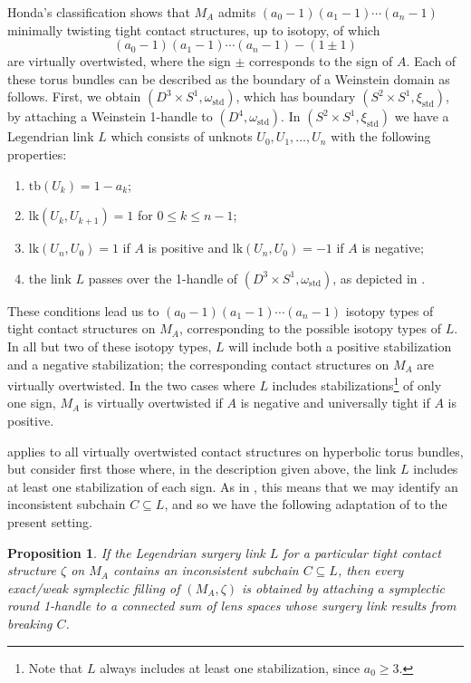 \documentclass[11pt]{amsart}
\numberwithin{equation}{section}
\theoremstyle{plain}
\newtheorem{prop}[equation]{Proposition}%
\theoremstyle{definition}
\theoremstyle{remark}\newtheorem{rem}[equation]{Remark}%
\theoremstyle{remark}\newtheorem{obs}[equation]{Observation}%
\begin{document}
Honda's classification shows that $M_A$ admits $(a_0-1)(a_1-1)\cdots(a_n-1)$ minimally twisting tight contact structures, up to isotopy, of which
\[
(a_0-1)(a_1-1)\cdots(a_n-1)-(1\pm 1)
\]
are virtually overtwisted, where the sign $\pm$ corresponds to the sign of $A$.  Each of these torus bundles can be described as the boundary of a Weinstein domain as follows.  First, we obtain $(D^3\times S^1,\omega_{\mathrm{std}})$, which has boundary $(S^2\times S^1,\xi_{\mathrm{std}})$, by attaching a Weinstein 1-handle to $(D^4,\omega_{\mathrm{std}})$.  In $(S^2\times S^1,\xi_{\mathrm{std}})$ we have a Legendrian link $L$ which consists of unknots $U_0,U_1,\ldots,U_n$ with the following properties:
\begin{enumerate}
    \item $\mathrm{tb}(U_k)=1-a_k$;
    \item $\mathrm{lk}(U_k,U_{k+1})=1$ for $0\leq k\leq n-1$;
    \item $\mathrm{lk}(U_n,U_0)=1$ if $A$ is positive and $\mathrm{lk}(U_n,U_0)=-1$ if $A$ is negative;
    \item the link $L$ passes over the 1-handle of $(D^3\times S^1,\omega_{\mathrm{std}})$, as depicted in .
\end{enumerate}
These conditions lead us to $(a_0-1)(a_1-1)\cdots(a_n-1)$ isotopy types of tight contact structures on $M_A$, corresponding to the possible isotopy types of $L$.  In all but two of these isotopy types, $L$ will include both a positive stabilization and a negative stabilization; the corresponding contact structures on $M_A$ are virtually overtwisted.  In the two cases where $L$ includes stabilizations\footnote{Note that $L$ always includes at least one stabilization, since $a_0\geq 3$.} of only one sign, $M_A$ is virtually overtwisted if $A$ is negative and universally tight if $A$ is positive.

 applies to all virtually overtwisted contact structures on hyperbolic torus bundles, but consider first those where, in the description given above, the link $L$ includes at least one stabilization of each sign.  As in , this means that we may identify an inconsistent subchain $C\subseteq L$, and so we have the following adaptation of  to the present setting.

\begin{prop}\label{prop:torus-bundle-inconsistent-subchain}
If the Legendrian surgery link $L$ for a particular tight contact structure $\zeta$ on $M_A$ contains an inconsistent subchain $C\subseteq L$, then every exact/weak symplectic filling of $(M_A,\zeta)$ is obtained by attaching a symplectic round 1-handle to a connected sum of lens spaces whose surgery link results from breaking $C$.
\end{prop}
\end{document}
